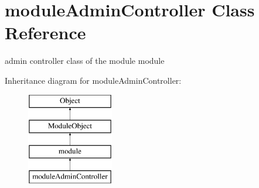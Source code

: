 \hypertarget{classmoduleAdminController}{}\section{module\+Admin\+Controller Class Reference}
\label{classmoduleAdminController}


admin controller class of the module module  


Inheritance diagram for module\+Admin\+Controller\+:\begin{figure}[H]
\begin{center}
\leavevmode
\includegraphics[height=4.000000cm]{classmoduleAdminController}
\end{center}
\end{figure}

